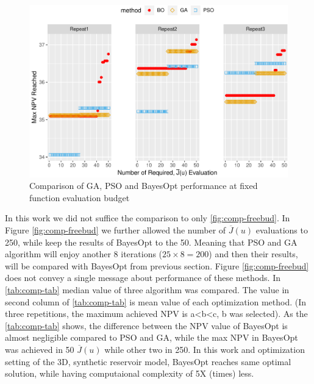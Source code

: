 \documentclass[]{elsarticle} %
\begin{document}
\begin{figure}

{\centering \includegraphics[width=0.9\linewidth]{0_Paper1_main_files/figure-latex/comp-fixbud-1} 

}

\caption{Comparison of GA, PSO and BayesOpt performance at fixed function evaluation budget}\label{fig:comp-fixbud}
\end{figure}

In this work we did not suffice the comparison to only \ref{fig:comp-freebud}. In Figure \ref{fig:comp-freebud} we further allowed the number of \(\overline{J}(u)\) evaluations to 250, while keep the results of BayesOpt to the 50. Meaning that PSO and GA algorithm will enjoy another 8 iterations (\(25\times8=200\)) and then their results, will be compared with BayesOpt from previous section. Figure \ref{fig:comp-freebud} does not convey a single message about performance of these methods. In \ref{tab:comp-tab} median value of three algorithm was compared. The value in second column of \ref{tab:comp-tab} is mean value of each optimization method. (In three repetitions, the maximum achieved NPV is a\textless b\textless c, b was selected). As the \ref{tab:comp-tab} shows, the difference between the NPV value of BayesOpt is almost negligible compared to PSO and GA, while the max NPV in BayesOpt was achieved in 50 \(\overline{J}(u)\) while other two in 250. In this work and optimization setting of the 3D, synthetic reservoir model, BayesOpt reaches same optimal solution, while having computaional complexity of 5X (times) less.
\end{document}
